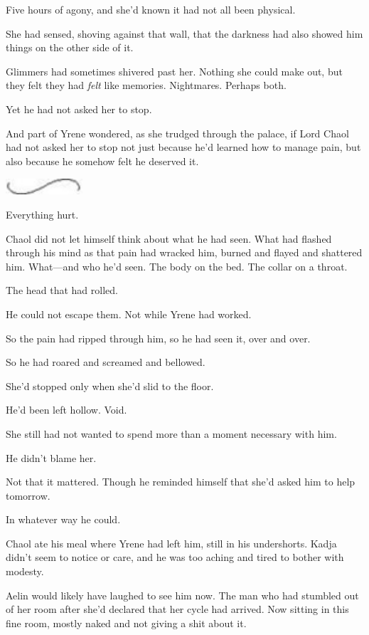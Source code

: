 Five hours of agony, and she'd known it had not all been physical.

She had sensed, shoving against that wall, that the darkness had also showed him things on the other side of it.

Glimmers had sometimes shivered past her. Nothing she could make out, but they felt  they had \emph{felt} like memories. Nightmares. Perhaps both.

Yet he had not asked her to stop.

And part of Yrene wondered, as she trudged through the palace, if Lord Chaol had not asked her to stop not just because he'd learned how to manage pain, but also because he somehow felt he deserved it.

\includegraphics[width=1.12in,height=0.24in]{images/seperator}

Everything hurt.

Chaol did not let himself think about what he had seen. What had flashed through his mind as that pain had wracked him, burned and flayed and shattered him. What---and who he'd seen. The body on the bed. The collar on a throat.

The head that had rolled.

He could not escape them. Not while Yrene had worked.

So the pain had ripped through him, so he had seen it, over and over.

So he had roared and screamed and bellowed.

She'd stopped only when she'd slid to the floor.

He'd been left hollow. Void.

She still had not wanted to spend more than a moment necessary with him.

He didn't blame her.

Not that it mattered. Though he reminded himself that she'd asked him to help tomorrow.

In whatever way he could.

Chaol ate his meal where Yrene had left him, still in his undershorts. Kadja didn't seem to notice or care, and he was too aching and tired to bother with modesty.

Aelin would likely have laughed to see him now. The man who had stumbled out of her room after she'd declared that her cycle had arrived. Now sitting in this fine room, mostly naked and not giving a shit about it.

